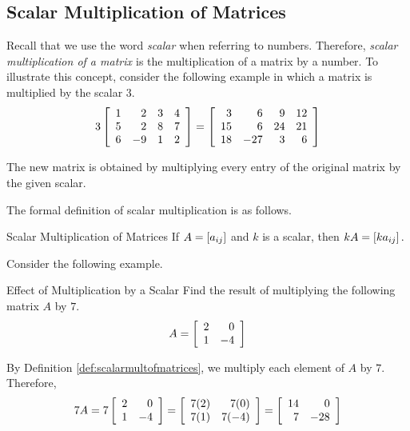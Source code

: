\subsection{Scalar Multiplication of Matrices}

Recall that we use the word {\em scalar \em}when referring to numbers. Therefore, {\em scalar multiplication of a matrix \em}is the multiplication of a matrix by a number.  
To illustrate this concept, consider the following example in which a
matrix is multiplied by the scalar $3$.
\begin{equation*}
3\left[
\begin{array}{rrrr}
1 & 2 & 3 & 4 \\
5 & 2 & 8 & 7 \\
6 & -9 & 1 & 2
\end{array}
\right] = \left[
\begin{array}{rrrr}
3 & 6 & 9 & 12 \\
15 & 6 & 24 & 21 \\
18 & -27 & 3 & 6
\end{array}
\right] 
\end{equation*}

The new matrix is obtained by multiplying every entry of the original matrix
by the given scalar. 

The formal definition of scalar multiplication is as follows.

\begin{definition}{Scalar Multiplication of Matrices}\label{def:scalarmultofmatrices}
If $A=\left[ a_{ij}\right] $ and $k$ is a scalar,
then $kA=\left[ ka_{ij}\right] .$ 
\end{definition}

Consider the following example.

\begin{example}{Effect of Multiplication by a Scalar}\label{exa:effectofscalarmult}
Find the result of multiplying the following matrix $A$ by $7$.
\begin{equation*}
A=\left[
\begin{array}{rr}
2 & 0 \\
1 & -4
\end{array}
\right]
\end{equation*}
\end{example}

\begin{solution}
By Definition \ref{def:scalarmultofmatrices}, we multiply each element of $A$ by $7$.
Therefore,
\begin{equation*}
7A = 
7\left[
\begin{array}{rr}
2 & 0 \\
1 & -4
\end{array}
\right] =
\left[
\begin{array}{rr}
7(2) & 7(0) \\
7(1) & 7(-4)
\end{array}
\right] =
\left[
\begin{array}{rr}
14 & 0 \\
7 & -28
\end{array}
\right]
\end{equation*}
\end{solution}

